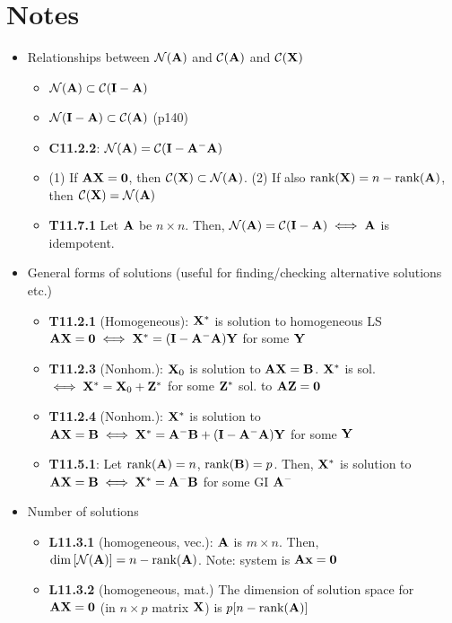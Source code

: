 \documentclass[a4paper, oneside]{book}
\begin{document}
\section*{Notes}
\begin{itemize}
\item Relationships between $\mathcal{N}(\mathbf{A})$ and $\mathcal{C}(\mathbf{A})$ and $\mathcal{C}(\mathbf{X})$
	\begin{itemize}
	\item $\mathcal{N}(\mathbf{A}) \subset \mathcal{C}(\mathbf{I-A})$
	\item $\mathcal{N}(\mathbf{I-A}) \subset \mathcal{C}(\mathbf{A})$ (p140)
	\item \textbf{C11.2.2}: $\mathcal{N}(\mathbf{A})=\mathcal{C}(\mathbf{I-A^-A})$ 
	\item (1) If $\mathbf{AX=0}$, then $\mathcal{C}(\mathbf{X})\subset \mathcal{N}(\mathbf{A})$. (2) If also $\text{rank}(\mathbf{X})=n-\text{rank}(\mathbf{A})$, then $\mathcal{C}(\mathbf{X})=\mathcal{N}(\mathbf{A})$
	\item \textbf{T11.7.1} Let $\mathbf{A}$ be $n\times n$.  Then, $\mathcal{N}(\mathbf{A})=\mathcal{C}(\mathbf{I-A}) \iff \mathbf{A}$ is idempotent.
	\end{itemize}
\item General forms of solutions (useful for finding/checking alternative solutions etc.)
	\begin{itemize}
	\item \textbf{T11.2.1} (Homogeneous): $\mathbf{X}^*$ is solution to homogeneous LS $\mathbf{AX=0} \iff \mathbf{X}^{*}=(\mathbf{I-A^- A})\mathbf{Y}$ for some $\mathbf{Y}$ 
	\item \textbf{T11.2.3} (Nonhom.): $\mathbf{X}_0$ is solution to $\mathbf{AX=B}$. $\mathbf{X}^{*}$ is sol. $\iff \mathbf{X}^*=\mathbf{X}_0+\mathbf{Z}^*$ for some $\mathbf{Z}^*$ sol. to $\mathbf{AZ=0}$
	\item \textbf{T11.2.4} (Nonhom.): $\mathbf{X}^{*}$ is solution to $\mathbf{AX=B} \iff \mathbf{X}^*=\mathbf{A^-B}+(\mathbf{I-A^-A})\mathbf{Y}$ for some $\mathbf{Y}$
	\item \textbf{T11.5.1}: Let $\text{rank}(\mathbf{A})=n$, $\text{rank}(\mathbf{B})=p$. Then, $\mathbf{X}^*$ is solution to $\mathbf{AX=B} \iff \mathbf{X}^*=\mathbf{A^-B}$ for some GI $\mathbf{A^-}$
	\end{itemize}
\item Number of solutions
	\begin{itemize}
	\item \textbf{L11.3.1} (homogeneous, vec.): $\mathbf{A}$ is $m\times n$. Then, $\dim\left[\mathcal{N}(\mathbf{A})\right]=n-\text{rank}(\mathbf{A})$. Note: system is $\mathbf{Ax=0}$
	\item \textbf{L11.3.2} (homogeneous, mat.) The dimension of solution space for $\mathbf{AX=0}$ (in $n\times p$ matrix $\mathbf{X}$) is $p[n-\text{rank}(\mathbf{A})]$

\end{itemize}
\end{itemize}
\end{document}
